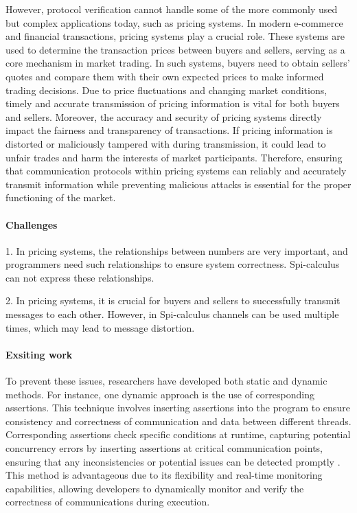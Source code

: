 \documentclass[master,english]{kuisthesis}
\theoremstyle{definition}
\begin{document}
However, protocol verification cannot handle some of the more commonly used but complex applications today, such as pricing systems. In modern e-commerce and financial transactions, pricing systems play a crucial role. These systems are used to determine the transaction prices between buyers and sellers, serving as a core mechanism in market trading. In such systems, buyers need to obtain sellers' quotes and compare them with their own expected prices to make informed trading decisions. Due to price fluctuations and changing market conditions, timely and accurate transmission of pricing information is vital for both buyers and sellers.
Moreover, the accuracy and security of pricing systems directly impact the fairness and transparency of transactions. If pricing information is distorted or maliciously tampered with during transmission, it could lead to unfair trades and harm the interests of market participants. Therefore, ensuring that communication protocols within pricing systems can reliably and accurately transmit information while preventing malicious attacks is essential for the proper functioning of the market.

\paragraph{Challenges}
1. In pricing systems, the relationships between numbers are very important, and programmers need such relationships to ensure system correctness. Spi-calculus can not express these relationships.

2. In pricing systems, it is crucial for buyers and sellers to successfully transmit messages to each other. However, in Spi-calculus channels can be used multiple times, which may lead to message distortion.


\paragraph{Exsiting work}
To prevent these issues, researchers have developed both static and dynamic methods. For instance, one dynamic approach is the use of corresponding assertions. This technique involves inserting assertions into the program to ensure consistency and correctness of communication and data between different threads. Corresponding assertions check specific conditions at runtime, capturing potential concurrency errors by inserting assertions at critical communication points, ensuring that any inconsistencies or potential issues can be detected promptly \cite{?}. This method is advantageous due to its flexibility and real-time monitoring capabilities, allowing developers to dynamically monitor and verify the correctness of communications during execution.
\end{document}

